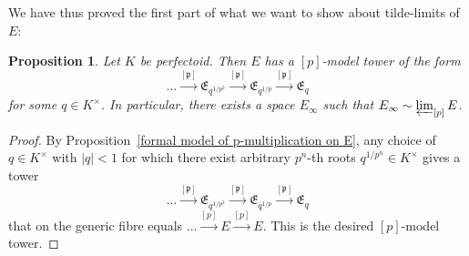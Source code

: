 \documentclass[11pt,oneside]{amsart}
\newtheorem{proposition}[theorem]{Proposition}
\theoremstyle{definition}
\theoremstyle{remark}
\begin{document}
	We have thus proved the first part of what we want to show about tilde-limits of $E$:
	\begin{proposition}\label{p-model tower exists for E}
		Let $K$ be perfectoid. Then $E$ has a $[p]$-model tower of the form
		\[\dots \xrightarrow{[\mathfrak p]} \mathfrak E_{q^{1/p^2}}\xrightarrow{[\mathfrak p]} \mathfrak E_{q^{1/p}}\xrightarrow{[\mathfrak p]} \mathfrak E_q\]
		for some $q\in K^\times$. In particular, there exists a space $E_\infty$ such that $E_\infty\sim \varprojlim_{[p]}E$.
	\end{proposition}
	\begin{proof}
		By Proposition~\ref{formal model of p-multiplication on E}, any choice of $q\in K^\times$ with $|q|<1$ for which there exist arbitrary $p^n$-th roots $q^{1/p^n}\in K^\times$ gives a tower
		\[\dots \xrightarrow{[\mathfrak p]} \mathfrak E_{q^{1/p^2}}\xrightarrow{[\mathfrak p]} \mathfrak E_{q^{1/p}}\xrightarrow{[\mathfrak p]} \mathfrak E_q\]
		that on the generic fibre equals $\dots\xrightarrow{[p]} E\xrightarrow{[p]} E$. This is the desired $[p]$-model tower.
	\end{proof}
	
\end{document}
